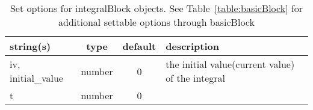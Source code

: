 \begin{table}[ht]
\centering
\begin{tabular}{p{5cm} c c p{7cm}}
\hline
string(s) & type & default & description \\
\hline
iv, initial\_value & number & 0 & the initial value(current value) of the integral\\
t & number & 0 & \\
\hline
\end{tabular}
\caption{Set options for integralBlock objects. See Table~\ref{table:basicBlock} for additional settable options through basicBlock}
\label{table:integralBlock}
\end{table}

